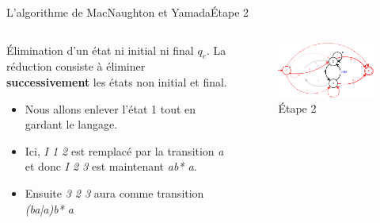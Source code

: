 \documentclass{beamer}
\begin{document}
\begin{frame}{L'algorithme de MacNaughton et Yamada}{Étape 2}
     \begin{columns}[T]
     \begin{column}{.48\textwidth}
         {\fontsize{8}{9}\selectfont Élimination d’un état ni initial ni final \textit{$q_e$}.}
         {\fontsize{8}{9}\selectfont La réduction consiste à éliminer \textbf{successivement} les états non initial et final.}
         \begin{itemize}
         
             \item {\fontsize{7}{8}\selectfont Nous allons enlever l'état 1 tout en gardant le langage.}
             \item {\fontsize{7}{8}\selectfont Ici, \textit{I 1 2} est remplacé par la transition \textit{a} et donc \textit{I 2 3} est maintenant \textit{ab* a}.}
             \item {\fontsize{7}{8}\selectfont Ensuite \textit{3 2 3} aura comme transition \textit{(ba|a)b* a}}
         \end{itemize}
     \end{column}
     
     \begin{column}{.48\textwidth}
     \begin{figure}
     \includegraphics[scale=0.37]{Diagramme3_3.png}
     \centering
     \caption{Étape 2}     
     \end{figure}
     \end{column}
        
     \end{columns}   

\end{frame}
\end{document}
